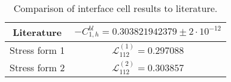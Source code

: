 \documentclass[12pt,a4paper]{article}
\begin{document}
\begin{table}[h!]
  \begin{center}
 \begin{tabular}{ | c | c |}
 \hline
 Literature & $-C_{1,h}^{bl} = 0.303821942379 \pm 2 \cdot 10^{-12}$ \\
 \hline
 Stress form 1 & $ \mathcal{L}^{(1)}_{112} = 0.297088 $ \\
 \hline
 Stress form 2 & $ \mathcal{L}^{(2)}_{112} = 0.303857 $ \\
 \hline
  \end{tabular}
    \caption{Comparison of interface cell results to literature.}
  \label{tab:chan-slip-comp-cavity}
  \end{center}
\end{table}
\end{document}
